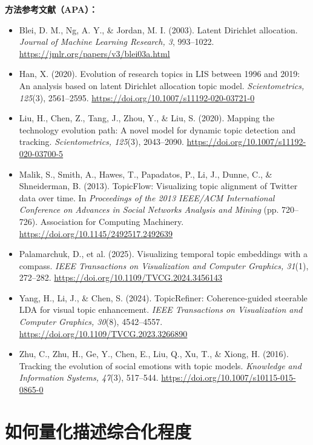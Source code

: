 \documentclass[12pt, a4paper, fontset=none]{ctexart}
\begin{document}
\textbf{方法参考文献（APA）：}
\begin{itemize}
    \item Blei, D. M., Ng, A. Y., \& Jordan, M. I. (2003). Latent Dirichlet allocation. \textit{Journal of Machine Learning Research, 3}, 993--1022. \url{https://jmlr.org/papers/v3/blei03a.html}
    \item Han, X. (2020). Evolution of research topics in LIS between 1996 and 2019: An analysis based on latent Dirichlet allocation topic model. \textit{Scientometrics, 125}(3), 2561--2595. \url{https://doi.org/10.1007/s11192-020-03721-0}
    \item Liu, H., Chen, Z., Tang, J., Zhou, Y., \& Liu, S. (2020). Mapping the technology evolution path: A novel model for dynamic topic detection and tracking. \textit{Scientometrics, 125}(3), 2043--2090. \url{https://doi.org/10.1007/s11192-020-03700-5}
    \item Malik, S., Smith, A., Hawes, T., Papadatos, P., Li, J., Dunne, C., \& Shneiderman, B. (2013). TopicFlow: Visualizing topic alignment of Twitter data over time. In \textit{Proceedings of the 2013 IEEE/ACM International Conference on Advances in Social Networks Analysis and Mining} (pp. 720--726). Association for Computing Machinery. \url{https://doi.org/10.1145/2492517.2492639}
    \item Palamarchuk, D., et al. (2025). Visualizing temporal topic embeddings with a compass. \textit{IEEE Transactions on Visualization and Computer Graphics, 31}(1), 272--282. \url{https://doi.org/10.1109/TVCG.2024.3456143}
    \item Yang, H., Li, J., \& Chen, S. (2024). TopicRefiner: Coherence-guided steerable LDA for visual topic enhancement. \textit{IEEE Transactions on Visualization and Computer Graphics, 30}(8), 4542--4557. \url{https://doi.org/10.1109/TVCG.2023.3266890}
    \item Zhu, C., Zhu, H., Ge, Y., Chen, E., Liu, Q., Xu, T., \& Xiong, H. (2016). Tracking the evolution of social emotions with topic models. \textit{Knowledge and Information Systems, 47}(3), 517--544. \url{https://doi.org/10.1007/s10115-015-0865-0}
\end{itemize}

\section{如何量化描述综合化程度}
\end{document}
